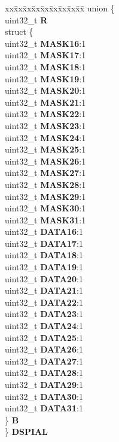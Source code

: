 \begin{DoxyCompactItemize}
\begin{tabbing}
\end{tabbing}\item 
\mbox{\label{structSIU__tag_aa2ba4e942d74028fb753c916a9c77817}} 
\begin{tabbing}
xx\=xx\=xx\=xx\=xx\=xx\=xx\=xx\=xx\=\kill
union \{\\
\>uint32\_t {\bfseries R}\\
\>struct \{\\
\>\>uint32\_t {\bfseries MASK16}:1\\
\>\>uint32\_t {\bfseries MASK17}:1\\
\>\>uint32\_t {\bfseries MASK18}:1\\
\>\>uint32\_t {\bfseries MASK19}:1\\
\>\>uint32\_t {\bfseries MASK20}:1\\
\>\>uint32\_t {\bfseries MASK21}:1\\
\>\>uint32\_t {\bfseries MASK22}:1\\
\>\>uint32\_t {\bfseries MASK23}:1\\
\>\>uint32\_t {\bfseries MASK24}:1\\
\>\>uint32\_t {\bfseries MASK25}:1\\
\>\>uint32\_t {\bfseries MASK26}:1\\
\>\>uint32\_t {\bfseries MASK27}:1\\
\>\>uint32\_t {\bfseries MASK28}:1\\
\>\>uint32\_t {\bfseries MASK29}:1\\
\>\>uint32\_t {\bfseries MASK30}:1\\
\>\>uint32\_t {\bfseries MASK31}:1\\
\>\>uint32\_t {\bfseries DATA16}:1\\
\>\>uint32\_t {\bfseries DATA17}:1\\
\>\>uint32\_t {\bfseries DATA18}:1\\
\>\>uint32\_t {\bfseries DATA19}:1\\
\>\>uint32\_t {\bfseries DATA20}:1\\
\>\>uint32\_t {\bfseries DATA21}:1\\
\>\>uint32\_t {\bfseries DATA22}:1\\
\>\>uint32\_t {\bfseries DATA23}:1\\
\>\>uint32\_t {\bfseries DATA24}:1\\
\>\>uint32\_t {\bfseries DATA25}:1\\
\>\>uint32\_t {\bfseries DATA26}:1\\
\>\>uint32\_t {\bfseries DATA27}:1\\
\>\>uint32\_t {\bfseries DATA28}:1\\
\>\>uint32\_t {\bfseries DATA29}:1\\
\>\>uint32\_t {\bfseries DATA30}:1\\
\>\>uint32\_t {\bfseries DATA31}:1\\
\>\} {\bfseries B}\\
\} {\bfseries DSPIAL}\\


\end{tabbing}
\end{DoxyCompactItemize}
